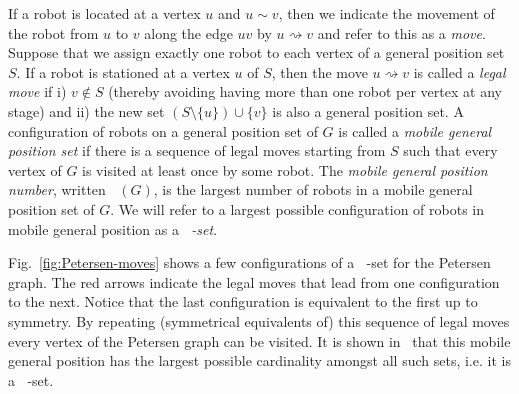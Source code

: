 \documentclass[a4paper,12pt]{article}
\DeclareMathOperator{\mob}{Mob_{gp}}
\theoremstyle{definition}
\newcommand{\move}{\rightsquigarrow}
\begin{document}
	If a robot is located at a vertex $u$ and $u \sim v$, then we indicate the movement of the robot from $u$ to $v$ along the edge $uv$ by $u \move v$ and refer to this as a \emph{move}. Suppose that we assign exactly one robot to each vertex of a general position set $S$. If a robot is stationed at a vertex $u$ of $S$, then the move $u \move v$ is called a \emph{legal move} if i) $v \notin S$ (thereby avoiding having more than one robot per vertex at any stage) and ii) the new set $(S\setminus\{ u\} ) \cup \{ v\}$ is also a general position set. A configuration of robots on a general position set of $G$ is called a \emph{mobile general position set} if there is a sequence of legal moves starting from $S$ such that every vertex of $G$ is visited at least once by some robot. The \emph{mobile general position number}, written $\mob (G)$, is the largest number of robots in a mobile general position set of $G$. We will refer to a largest possible configuration of robots in mobile general position as a {\em $\mob$-set}. 
	
	Fig.~\ref{fig:Petersen-moves} shows a few configurations of a $\mob$-set for the Petersen graph. The red arrows indicate the legal moves that lead from one configuration to the next. Notice that the last configuration is equivalent to the first up to symmetry. By repeating (symmetrical equivalents of) this sequence of legal moves every vertex of the Petersen graph can be visited. It is shown in~\cite{klavzar-2023} that this mobile general position has the largest possible cardinality amongst all such sets, i.e. it is a $\mob$-set.
	
\end{document}
